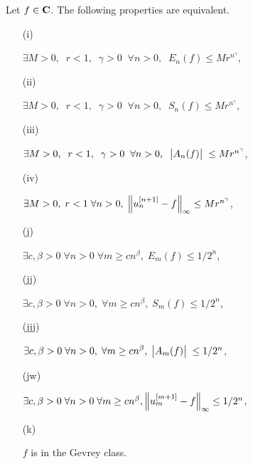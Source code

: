 \begin{theorem} \label{523}
Let $f\in {\bf C}$. The following properties are equivalent. 
\begin{itemize}

\item [(i)] 

$ \exists M > 0, \; \; r < 1, \; \; \gamma > 0 \; \; \forall n> 0, \; \; E_n(f) \leq Mr^{n^{\gamma}}$,

\item [(ii)]
 
$ \exists M > 0, \; \; r < 1, \; \; \gamma > 0 \; \; \forall n> 0, \; \; S_n(f) \leq Mr^{n^{\gamma}}$,

\item [(iii)]
 
$ \exists M > 0, \; \; r < 1, \; \; \gamma > 0 \; \; \forall n> 0, \; \; \big|{A_n(f)}\big|\; \leq Mr^{n^{\gamma}}$, 

\item [(iv)]
 
$ \exists M > 0, \; r < 1 \; \forall n> 0, \; \Big\lVert  u_n^{[n+1]} - f  \Big\rVert_{\infty} \leq Mr^{n^{\gamma}}$,

\item [(j)] 

$ \exists c, \beta > 0 \; \forall n> 0\; \forall m \geq cn^{\beta}, \; E_m(f) \leq 1/2^n $,

\item [(jj)]

$ \exists c, \beta > 0 \; \forall n> 0,\; \forall m \geq cn^{\beta}, \; S_m(f) \leq 1/2^n $,

\item [(jjj)] 

$ \exists c, \beta > 0 \; \forall n> 0,\; \forall m \geq cn^{\beta}, \; 
\big|{A_m(f)}\big|\; \leq 1/2^n $,

\item [(jw)]
 
$ \exists c, \beta > 0 \; \forall n> 0\;\forall m \geq cn^{\beta}, \Big\lVert  u_m^{[m+1]} - f  \Big\rVert_{\infty} \leq 1/2^n $,

\item [(k)] 

$f$ is in the Gevrey class.
\end{itemize}
\end{theorem}

